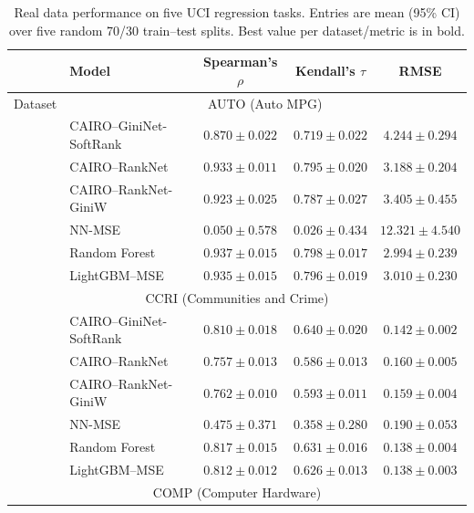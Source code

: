 \documentclass[11pt]{article}
\theoremstyle{plain}
\theoremstyle{plain}
\theoremstyle{plain}
\theoremstyle{plain}
\theoremstyle{plain}
\theoremstyle{plain}
\theoremstyle{plain}
\begin{document}
\begin{table} 
    \centering
    \caption{Real data performance on five UCI regression tasks.
    Entries are mean (95\% CI) over five random 70/30 train--test splits.
    Best value per dataset/metric is in bold.}
    \label{tab:real_all}
    \renewcommand{\arraystretch}{1} %
    \begin{tabular}{llccc}
        \toprule
         & Model & Spearman's $\rho$ & Kendall's $\tau$ & RMSE \\
        \midrule
        Dataset & \multicolumn{4}{c}{AUTO (Auto MPG)} \\
        \midrule
        & \textsc{CAIRO}--GiniNet-SoftRank
        & $0.870 \pm 0.022$ & $0.719 \pm 0.022$ & $4.244 \pm 0.294$ \\
        & \textsc{CAIRO}--RankNet
        & $0.933 \pm 0.011$ & $0.795 \pm 0.020$ & $3.188 \pm 0.204$ \\
        & \textsc{CAIRO}--RankNet-GiniW
        & $0.923 \pm 0.025$ & $0.787 \pm 0.027$ & $3.405 \pm 0.455$ \\
        & NN-MSE
        & $0.050 \pm 0.578$ & $0.026 \pm 0.434$ & $12.321 \pm 4.540$ \\
        & Random Forest
        & $\mathbf{0.937 \pm 0.015}$ & $\mathbf{0.798 \pm 0.017}$ & $\mathbf{2.994 \pm 0.239}$ \\
        & LightGBM--MSE
        & $0.935 \pm 0.015$ & $0.796 \pm 0.019$ & $3.010 \pm 0.230$ \\
        \midrule
        \multicolumn{5}{c}{CCRI (Communities and Crime)} \\
        \midrule
        & \textsc{CAIRO}--GiniNet-SoftRank
        & $0.810 \pm 0.018$ & $\mathbf{0.640 \pm 0.020}$ & $0.142 \pm 0.002$ \\
        & \textsc{CAIRO}--RankNet
        & $0.757 \pm 0.013$ & $0.586 \pm 0.013$ & $0.160 \pm 0.005$ \\
        & \textsc{CAIRO}--RankNet-GiniW
        & $0.762 \pm 0.010$ & $0.593 \pm 0.011$ & $0.159 \pm 0.004$ \\
        & NN-MSE
        & $0.475 \pm 0.371$ & $0.358 \pm 0.280$ & $0.190 \pm 0.053$ \\
        & Random Forest
        & $\mathbf{0.817 \pm 0.015}$ & $0.631 \pm 0.016$ & $\mathbf{0.138 \pm 0.004}$ \\
        & LightGBM--MSE
        & $0.812 \pm 0.012$ & $0.626 \pm 0.013$ & $\mathbf{0.138 \pm 0.003}$ \\
        \midrule
        \multicolumn{5}{c}{COMP (Computer Hardware)} \\

\end{tabular}
\end{table}
\end{document}
